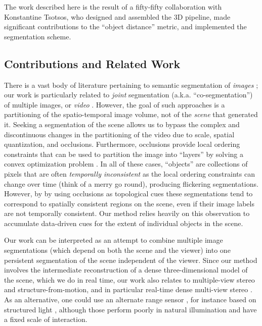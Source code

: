 The work described here is the result of a fifty-fifty collaboration with Konstantine Tsotsos, who designed and assembled the 3D pipeline, made significant contributions to the 
``object distance'' metric, and implemented the segmentation scheme.
\iffalse
\TODO{There is a lack of details and motivation for the geodesic distance function, Sec. 2.4. This is regrettable, since this is the main novelty of the approach. The rest of the paper feels like a combination of other prior work, and not so much novel information is presented.}
\fi
\subsection{Contributions and Related Work}
There is a vast body of literature pertaining to semantic segmentation of {\em images}
\cite{VittorioFerrari:2006uf,AlexanderVezhnevets:2012tw,Martnez:2004dz,WeiFeng:cw,GuofengZhang:jma,
ulen-strandmark-etal-itmi-12,Russell06,ics_nips11,Lempitsky11,Kumar10,nieuwenhuis-et-al-ijcv12};
our work is particularly related to {\em joint} segmentation (a.k.a. ``co-segmentation'') of
multiple images, or {\em video}
\cite{vezhneva:2012tb,GuofengZhang:jmb,Cremers-et-al-11,Schoenemann-Cremers-pami10,lezama11,
carreira_eccv12}. However, the goal of such
approaches is a partitioning of the spatio-temporal
image volume, not of the {\em scene} that generated it. Seeking a segmentation of the scene allows
us to bypass the complex and discontinuous changes in the partitioning of the video due to scale,
spatial quantization, and occlusions.  Furthermore, occlusions provide local ordering constraints that can be
used to partition the image into
``layers'' \cite{wangA94,Reid:2010ca,GuofengZhang:jm,Cremers-12,Kumar08,Kumar05a} by solving a
convex optimization problem \cite{Cremers-et-al-11}. In all of these cases, ``objects'' are
collections of pixels that are often {\em temporally inconsistent} as the local ordering constraints
can change over time (think of a merry go round), producing flickering segmentations. However, by
by using occlusions as topological cues these segmentations tend to correspond to spatially
consistent regions on the scene, even if their image labels are not temporally consistent. Our
method relies heavily on this observation to accumulate data-driven cues for the extent of
individual objects in the scene.

Our work can be interpreted as an attempt to combine multiple image segmentations (which depend on
both the scene and the viewer) into one persistent segmentation of the scene independent of the
viewer.  Since our method involves the intermediate reconstruction of a dense three-dimensional
model of the scene, which we do in real time, our work also relates to multiple-view stereo and
structure-from-motion, and in particular real-time dense multi-view
stereo \cite{davison,cremers,pock}. As an alternative, one could use an alternate range sensor
\cite{RobFergus:2012vh}, for instance based on structured light \cite{Newcombe2011a}, although
those perform poorly in natural illumination and have a fixed scale of interaction.

